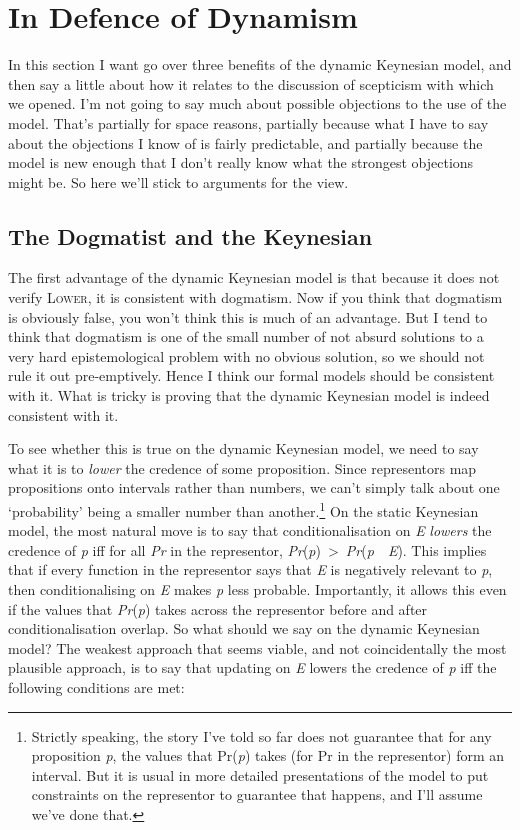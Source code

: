 \documentclass[
  10pt,
  letterpaper,
  DIV=11,
  numbers=noendperiod,
  twoside]{scrartcl}
\begin{document}
\section{In Defence of Dynamism}\label{in-defence-of-dynamism}

In this section I want go over three benefits of the dynamic Keynesian
model, and then say a little about how it relates to the discussion of
scepticism with which we opened. I'm not going to say much about
possible objections to the use of the model. That's partially for space
reasons, partially because what I have to say about the objections I
know of is fairly predictable, and partially because the model is new
enough that I don't really know what the strongest objections might be.
So here we'll stick to arguments for the view.

\subsection{The Dogmatist and the
Keynesian}\label{the-dogmatist-and-the-keynesian}

The first advantage of the dynamic Keynesian model is that because it
does not verify \textsc{Lower}, it is consistent with dogmatism. Now if
you think that dogmatism is obviously false, you won't think this is
much of an advantage. But I tend to think that dogmatism is one of the
small number of not absurd solutions to a very hard epistemological
problem with no obvious solution, so we should not rule it out
pre-emptively. Hence I think our formal models should be consistent with
it. What is tricky is proving that the dynamic Keynesian model is indeed
consistent with it.

To see whether this is true on the dynamic Keynesian model, we need to
say what it is to \emph{lower} the credence of some proposition. Since
representors map propositions onto intervals rather than numbers, we
can't simply talk about one `probability' being a smaller number than
another.\footnote{Strictly speaking, the story I've told so far does not
  guarantee that for any proposition \emph{p}, the values that
  Pr(\emph{p}) takes (for Pr in the representor) form an interval. But
  it is usual in more detailed presentations of the model to put
  constraints on the representor to guarantee that happens, and I'll
  assume we've done that.} On the static Keynesian model, the most
natural move is to say that conditionalisation on \emph{E} \emph{lowers}
the credence of \emph{p} iff for all \emph{Pr} in the representor,
\emph{Pr}(\emph{p})~\textgreater~\emph{Pr}(\emph{p}~\textbar~\emph{E}).
This implies that if every function in the representor says that
\emph{E} is negatively relevant to \emph{p}, then conditionalising on
\emph{E} makes \emph{p} less probable. Importantly, it allows this even
if the values that \emph{Pr}(\emph{p}) takes across the representor
before and after conditionalisation overlap. So what should we say on
the dynamic Keynesian model? The weakest approach that seems viable, and
not coincidentally the most plausible approach, is to say that updating
on \emph{E} lowers the credence of \emph{p} iff the following conditions
are met:
\end{document}
